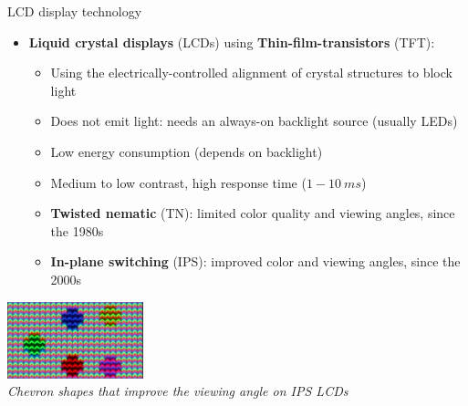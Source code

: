 \begin{frame}{LCD display technology}
  \begin{itemize}
  \item \textbf{Liquid crystal displays} (LCDs) using \textbf{Thin-film-transistors} (TFT):
    \begin{itemize}
    \item Using the electrically-controlled alignment of crystal structures to block light
    \item Does not emit light: needs an always-on backlight source (usually LEDs)
    \item Low energy consumption (depends on backlight)
    \item Medium to low contrast, high response time (\(1-10~ms\))
    \item \textbf{Twisted nematic} (TN): limited color quality and viewing angles, since the 1980s
    \item \textbf{In-plane switching} (IPS): improved color and viewing angles, since the 2000s
    \end{itemize}
  \end{itemize}

  \begin{center}
  \includegraphics[height=6em]{slides/graphics-introduction/lcd-ips-shape.jpg}\\
  \textit{\small Chevron shapes that improve the viewing angle on IPS LCDs}
  \end{center}
\end{frame}

